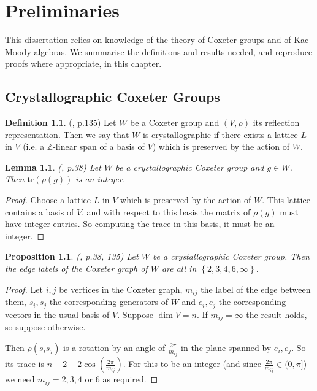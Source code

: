 \documentclass[11pt,a4paper]{report}
\newtheorem{lemma}[theorem]{Lemma}
\newtheorem{proposition}[theorem]{Proposition}
\theoremstyle{definition}
\newtheorem{definition}[theorem]{Definition}
\begin{document}
\chapter{Preliminaries}

\label{chap:2}

This dissertation relies on knowledge of the theory of Coxeter groups and of Kac-Moody algebras. We summarise the definitions and results needed, and reproduce proofs where appropriate, in this chapter. 
\section{Crystallographic Coxeter Groups}
\begin{definition} (\cite{Humphreys}, p.135) Let $W$ be a Coxeter group and $(V, \rho)$ its reflection representation. Then we say that $W$ is crystallographic if there exists a lattice $L$ in $V$ (i.e. a $\mathbb{Z}$-linear span of a basis of $V$) which is preserved by the action of $W$. \end{definition}

\begin{lemma}(\cite{Humphreys}, p.38) Let $W$ be a crystallographic Coxeter group and $g \in W$. Then $\mathrm{tr}(\rho(g))$ is an integer.\end{lemma}

\begin{proof}Choose a lattice $L$ in $V$ which is preserved by the action of $W$. This lattice contains a basis of $V$, and with respect to this basis the matrix of $\rho(g)$ must have integer entries. So computing the trace in this basis, it must be an integer.\end{proof}

\begin{proposition} (\cite{Humphreys}, p.38, 135) Let $W$ be a crystallographic Coxeter group. Then the edge labels of the Coxeter graph of $W$ are all in $\left\{2,3,4,6,\infty\right\}$.\end{proposition}

\begin{proof}Let $i, j$ be vertices in the Coxeter graph, $m_{ij}$ the label of the edge between them, $s_i, s_j$ the corresponding generators of $W$ and $e_i, e_j$ the corresponding vectors in the usual basis of $V$. Suppose $\dim V = n$. If $m_{ij} = \infty$ the result holds, so suppose otherwise.

Then $\rho(s_i s_j)$ is a rotation by an angle of $\frac{2 \pi}{m_{ij}}$ in the plane spanned by $e_i, e_j$. So its trace is $n - 2 + 2 \cos(\frac{2 \pi}{m_{ij}})$. For this to be an integer (and since $\frac{2 \pi}{m_{ij}} \in (0, \pi]$) we need $m_{ij} = 2,3,4$ or $6$ as required.\end{proof}
\end{document}
